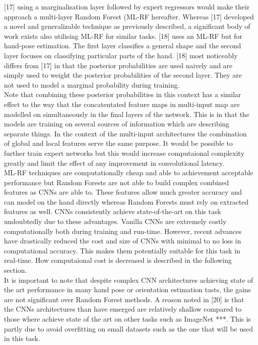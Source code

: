 \documentclass{article}
\begin{document}
[17] using a marginalisation layer followed by expert regressors would make their approach a multi-layer Random Forest (ML-RF hereafter. Whereas [17] developed a novel and generalizable technique as previously described, a significant body of work exists also utilising ML-RF for similar tasks. [18] uses an ML-RF but for hand-pose estimation. The first layer classifies a general shape and the second layer focuses on classifying particular parts of the hand. [18] most noticeably differs from [17] in that the posterior probabilities are used naively and are simply used to weight the posterior probabilities of the second layer. They are not used to model a marginal probability during training. \\

Note that combining these posterior probabilities in this context has a similar effect to the way that the concatentated feature maps in multi-input map are modelled on simultaneously in the final layers of the network. This is in that the models are training on several sources of information which are describing separate things. In the context of the multi-input architectures the combination of global and local features serve the same purpose. It would be possible to further train expert networks but this would increase computaional complexity greatly and limit the effect of any improvement in convolutional latency. \\

ML-RF techniques are computationally cheap and able to achievement acceptable performance but Random Forests are not able to build complex combined features as CNNs are able to. These features allow much greater accuracy and can model on the hand directly whereas Random Forests must rely on extracted features as well. CNNs consistently achieve state-of-the-art on this task undoubtedly due to these advantages. Vanilla CNNs are extremely costly computationally both during training and run-time. However, recent advances have drastically reduced the cost and size of CNNs with minimal to no loss in computational accuracy. This makes them potentially suitable for this task in real-time. How computaional cost is decreased is described in the following section. \\

It is important to note that despite complex CNN architectures achieving state of the art performance in many hand pose or orientation estimation tasts, the gains are not significant over Random Forest methods. A reason noted in [20] is that the CNNs architectures than have emerged are relatively shallow compared to those where achieve state of the art on other tasks such as ImageNet ***. This is partly due to avoid overfitting on small datasets such as the one that will be used in this task. \\
\end{document}
